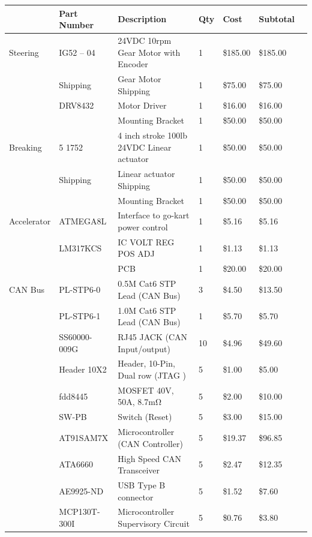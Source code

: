 \begin{table}[h]
  \small
  \begin{center}
    \begin{tabular}{ | l | l | p{} | l | l | l | l | }
      \hline
      & Part Number & Description & Qty & Cost & Subtotal \\
      \hline
      Steering & IG52 – 04 & 24VDC 10rpm Gear Motor with Encoder & 1 & \$185.00 & \$185.00 \\
      & Shipping & Gear Motor Shipping & 1 & \$75.00 & \$75.00 \\
      & DRV8432 & Motor Driver & 1 & \$16.00 & \$16.00 \\
      &  & Mounting Bracket & 1 & \$50.00 & \$50.00 \\
      \hline
      Breaking & 5 1752 & 4 inch stroke 100lb 24VDC Linear actuator  & 1 & \$50.00 & \$50.00 \\
      & Shipping & Linear actuator Shipping & 1 & \$50.00 & \$50.00 \\
      &  & Mounting Bracket & 1 & \$50.00 & \$50.00 \\
      \hline
      Accelerator & ATMEGA8L & Interface to go-kart power control & 1 & \$5.16 & \$5.16 \\
      & LM317KCS & IC VOLT REG POS ADJ & 1 & \$1.13 & \$1.13 \\
      &  & PCB & 1 & \$20.00 & \$20.00 \\
      \hline
      CAN Bus & PL-STP6-0 & 0.5M Cat6 STP Lead (CAN Bus) & 3 & \$4.50 & \$13.50 \\
      & PL-STP6-1 & 1.0M Cat6 STP Lead (CAN Bus) & 1 & \$5.70 & \$5.70 \\
      & SS60000-009G & RJ45 JACK (CAN Input/output) & 10 & \$4.96 & \$49.60 \\
      & Header 10X2 & Header, 10-Pin, Dual row (JTAG ) & 5 & \$1.00 & \$5.00 \\
      & fdd8445 & MOSFET 40V, 50A, 8.7mΩ & 5 & \$2.00 & \$10.00 \\
      & SW-PB & Switch (Reset) & 5 & \$3.00 & \$15.00 \\
      & AT91SAM7X & Microcontroller (CAN Controller) & 5 & \$19.37 & \$96.85 \\
      & ATA6660 & High Speed CAN Transceiver & 5 & \$2.47 & \$12.35 \\
      & AE9925-ND & USB Type B connector & 5 & \$1.52 & \$7.60 \\
      & MCP130T-300I & Microcontroller Supervisory Circuit & 5 & \$0.76 & \$3.80 \\

\end{tabular}
\end{center}
\end{table}
